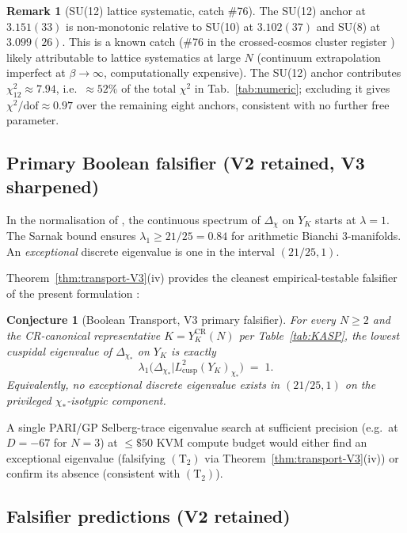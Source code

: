 \documentclass[11pt,a4paper,reqno]{amsart}
\newtheorem{conjecture}[theorem]{Conjecture}
\theoremstyle{definition}
\newtheorem{remark}[theorem]{Remark}
\newcommand{\YK}{Y_K}
\newcommand{\YKCR}{Y_K^{\mathrm{CR}}}
\newcommand{\Lcusp}{L^2_{\mathrm{cusp}}}
\newcommand{\Ctwo}{(\mathrm{T}_{2})}
\begin{document}
\begin{remark}[SU(12) lattice systematic, catch \#76]\label{rem:SU12}
The SU(12) anchor at $3.151(33)$ is non-monotonic relative to
SU(10) at $3.102(37)$ and SU(8) at $3.099(26)$. This is a known
catch (\#76 in the crossed-cosmos cluster register
\cite[\S 5]{Remondiere2026FaltingsLLZDigest}) likely attributable
to lattice systematics at large $N$ (continuum extrapolation
imperfect at $\beta\to\infty$, computationally expensive). The
SU(12) anchor contributes $\chi^2_{12}\approx 7.94$, i.e.\
$\approx 52\%$ of the total $\chi^2$ in
Tab.~\ref{tab:numeric}; excluding it gives
$\chi^2/\text{dof}\approx 0.97$ over the remaining eight anchors,
consistent with no further free parameter.
\end{remark}

\subsection{Primary Boolean falsifier (V2 retained, V3 sharpened)}\label{ss:boolean}

In the normalisation of \cite[\S\S 6.1, 7.4]{ElstrodtGrunewaldMennicke1998},
the continuous spectrum of $\Delta_{\chi}$ on $\YK$ starts at
$\lambda = 1$. The Sarnak bound \cite[Thm.~1.1]{Sarnak1983} ensures
$\lambda_1\ge 21/25 = 0.84$ for arithmetic Bianchi 3-manifolds. An
\emph{exceptional} discrete eigenvalue is one in the interval
$(21/25, 1)$.

Theorem~\ref{thm:transport-V3}(iv) provides the cleanest
empirical-testable falsifier of the present formulation :

\begin{conjecture}[Boolean Transport, V3 primary falsifier]\label{conj:boolean-V3}
For every $N\ge 2$ and the CR-canonical representative $K = \YKCR(N)$
per Table~\ref{tab:KASP}, the lowest cuspidal eigenvalue of
$\Delta_{\chi_*}$ on $\YK$ is exactly
\[
   \lambda_1\bigl(\Delta_{\chi_*}\big|\Lcusp(\YK)_{\chi_*}\bigr)
   \;=\; 1.
\]
Equivalently, no exceptional discrete eigenvalue exists in
$(21/25, 1)$ on the privileged $\chi_*$-isotypic component.
\end{conjecture}

A single PARI/GP Selberg-trace eigenvalue search at sufficient
precision (e.g.\ at $D=-67$ for $N=3$) at $\le \$50$ KVM compute
budget would either find an exceptional eigenvalue (falsifying
$\Ctwo$ via Theorem~\ref{thm:transport-V3}(iv)) or confirm its
absence (consistent with $\Ctwo$).

\subsection{Falsifier predictions (V2 retained)}\label{ss:falsifier-predictions}
\end{document}

